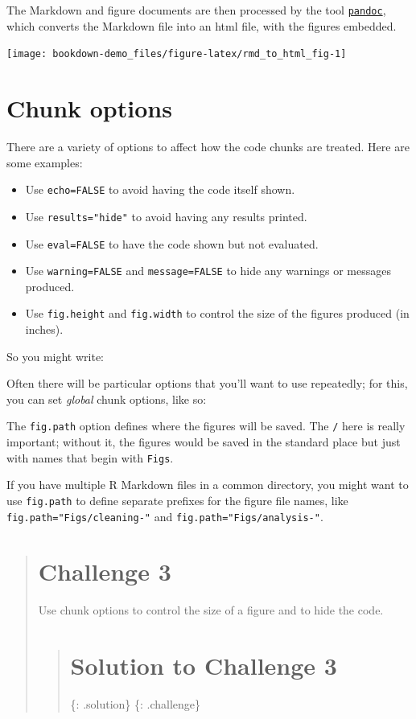 \documentclass[]{book}
\providecommand{\tightlist}{%
  \setlength{\itemsep}{0pt}\setlength{\parskip}{0pt}}
\begin{document}
The Markdown and figure documents are then processed by the tool
\href{http://pandoc.org/}{\texttt{pandoc}}, which converts the Markdown
file into an html file, with the figures embedded.

\begin{flushleft}\texttt{[image: bookdown-demo\_files/figure-latex/rmd\_to\_html\_fig-1]} \end{flushleft}

\section{Chunk options}\label{chunk-options}

There are a variety of options to affect how the code chunks are
treated. Here are some examples:

\begin{itemize}
\tightlist
\item
  Use \texttt{echo=FALSE} to avoid having the code itself shown.
\item
  Use \texttt{results="hide"} to avoid having any results printed.
\item
  Use \texttt{eval=FALSE} to have the code shown but not evaluated.
\item
  Use \texttt{warning=FALSE} and \texttt{message=FALSE} to hide any
  warnings or messages produced.
\item
  Use \texttt{fig.height} and \texttt{fig.width} to control the size of
  the figures produced (in inches).
\end{itemize}

So you might write:

Often there will be particular options that you'll want to use
repeatedly; for this, you can set \emph{global} chunk options, like so:

The \texttt{fig.path} option defines where the figures will be saved.
The \texttt{/} here is really important; without it, the figures would
be saved in the standard place but just with names that begin with
\texttt{Figs}.

If you have multiple R Markdown files in a common directory, you might
want to use \texttt{fig.path} to define separate prefixes for the figure
file names, like \texttt{fig.path="Figs/cleaning-"} and
\texttt{fig.path="Figs/analysis-"}.

\begin{quote}
\section{Challenge 3}\label{challenge-3-1}

Use chunk options to control the size of a figure and to hide the code.

\begin{quote}
\section{Solution to Challenge 3}\label{solution-to-challenge-3}

\{: .solution\} \{: .challenge\}
\end{quote}
\end{quote}
\end{document}
